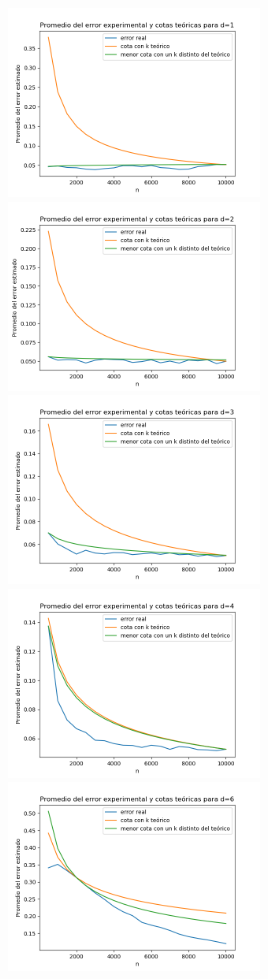 \documentclass[12pt, a4paper]{article}
\begin{document}
\includegraphics[width=0.5\textwidth]{figuras_h=0.5/cotas-error-d=1}
\includegraphics[width=0.5\textwidth]{figuras_h=0.5/cotas-error-d=2}
\includegraphics[width=0.5\textwidth]{figuras_h=0.5/cotas-error-d=3}
\includegraphics[width=0.5\textwidth]{figuras_h=0.5/cotas-error-d=4}
\includegraphics[width=0.5\textwidth]{figuras_h=0.5/cotas-error-d=6}
\end{document}
